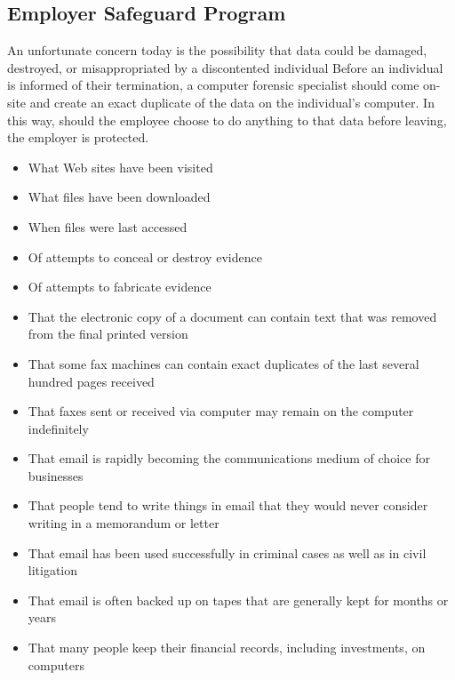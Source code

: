 \documentclass{scrreprt}
\begin{document}
\subsection{Employer Safeguard Program}
An unfortunate concern today is the possibility that data could be damaged, destroyed, or misappropriated by a discontented individual Before an individual is informed of their termination, a computer forensic specialist should come on-site and create an exact duplicate of the data on the individual’s computer. In this way, should the employee choose to do anything to that
data before leaving, the employer is protected.
\begin{itemize}
\item What Web sites have been visited
\item What files have been downloaded
\item When files were last accessed
\item Of attempts to conceal or destroy evidence
\item Of attempts to fabricate evidence
\item That the electronic copy of a document can contain text that was removed
from the final printed version
\item That some fax machines can contain exact duplicates of the last several hundred
pages received
\item That faxes sent or received via computer may remain on the computer indefinitely
\item That email is rapidly becoming the communications medium of choice for
businesses
\item That people tend to write things in email that they would never consider writing in a memorandum or letter
\item That email has been used successfully in criminal cases as well as in civil litigation
\item That email is often backed up on tapes that are generally kept for months or years
\item That many people keep their financial records, including investments, on
computers
\end{itemize}
\end{document}
